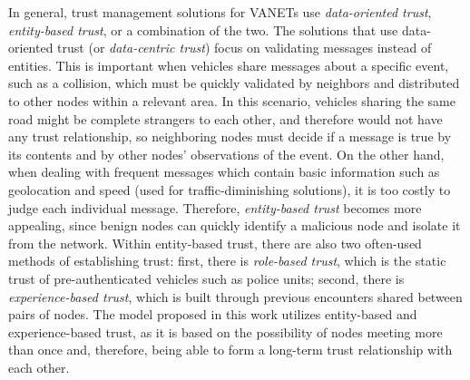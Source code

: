 In general, trust management solutions for VANETs use \textit{data-oriented trust}, \textit{entity-based trust}, or a combination of the two.
The solutions that use data-oriented trust (or \textit{data-centric trust}) \cite{raya2008data} focus on validating messages instead of entities.
This is important when vehicles share messages about a specific event, such as a collision, which must be quickly validated by neighbors and distributed to other nodes within a relevant area.
In this scenario, vehicles sharing the same road might be complete strangers to each other, and therefore would not have any trust relationship, so neighboring nodes must decide if a message is true by its contents and by other nodes' observations of the event.
On the other hand, when dealing with frequent messages which contain basic information such as geolocation and speed (used for traffic-diminishing solutions), it is too costly to judge each individual message.
Therefore, \textit{entity-based trust} becomes more appealing, since benign nodes can quickly identify a malicious node and isolate it from the network.
Within entity-based trust, there are also two often-used methods of establishing trust: first, there is \textit{role-based trust}, which is the static trust of pre-authenticated vehicles such as police units; second, there is \textit{experience-based trust}, which is built through previous encounters shared between pairs of nodes.
The model proposed in this work utilizes entity-based and experience-based trust, as it is based on the possibility of nodes meeting more than once and, therefore, being able to form a long-term trust relationship with each other.


